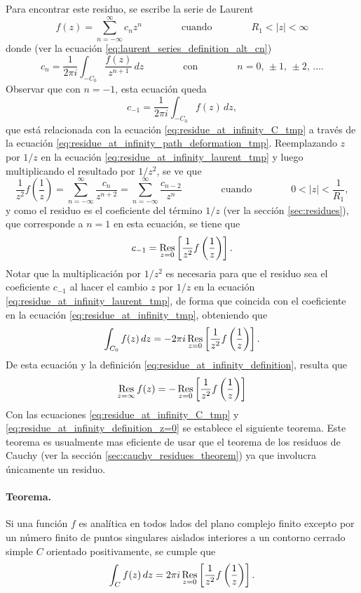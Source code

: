 \documentclass[a4paper]{report}
\def\Res{\qopname\relax m{Res}}
\begin{document}
Para encontrar este residuo, se escribe la serie de Laurent
\begin{equation}\label{eq:residue_at_infinity_laurent_tmp}
 f(z)=\sum_{n=-\infty}^\infty c_nz^n
 \qquad\qquad\textrm{cuando}\qquad\qquad
 R_1<|z|<\infty
\end{equation}
donde (ver la ecuación \ref{eq:laurent_series_definition_alt_cn})
\[
 c_n=\frac{1}{2\pi i}\int_{-C_0}\frac{f(z)}{z^{n+1}}\,dz
 \qquad\qquad\textrm{con}\qquad\qquad
 n=0,\,\pm1,\,\pm2,\,\dots. 
\]
Observar que con \(n=-1\), esta ecuación queda
\begin{equation}\label{eq:residue_at_infinity_tmp}
  c_{-1}=\frac{1}{2\pi i}\int_{-C_0}f(z)\,dz, 
\end{equation}
que está relacionada con la ecuación \ref{eq:residue_at_infinity_C_tmp} a través de la ecuación \ref{eq:residue_at_infinity_path_deformation_tmp}. Reemplazando \(z\) por \(1/z\) en la ecuación \ref{eq:residue_at_infinity_laurent_tmp} y luego multiplicando el resultado por \(1/z^2\), se ve que 
\[
 \frac{1}{z^2}f\left(\frac{1}{z}\right)=\sum_{n=-\infty}^\infty\frac{c_n}{z^{n+2}}
  =\sum_{n=-\infty}^\infty\frac{c_{n-2}}{z^n}
 \qquad\qquad\textrm{cuando}\qquad\qquad
 0<|z|<\frac{1}{R_1},
\]
y como el residuo es el coeficiente del término \(1/z\) (ver la sección \ref{sec:residues}), que corresponde a \(n=1\) en esta ecuación, se tiene que 
\[
 c_{-1}=\Res_{z=0}\left[\frac{1}{z^2}f\left(\frac{1}{z}\right)\right].
\]
Notar que la multiplicación por \(1/z^2\) es necesaria para que el residuo sea el coeficiente \(c_{-1}\) al hacer el cambio \(z\) por \(1/z\) en la ecuación \ref{eq:residue_at_infinity_laurent_tmp}, de forma que coincida con el coeficiente en la ecuación \ref{eq:residue_at_infinity_tmp}, obteniendo que
\[
 \int_{C_0}f(z)\,dz=-2\pi i\Res_{z=0}\left[\frac{1}{z^2}f\left(\frac{1}{z}\right)\right].
\]
De esta ecuación y la definición \ref{eq:residue_at_infinity_definition}, resulta que 
\begin{equation}\label{eq:residue_at_infinity_definition_z=0}
 \Res_{z=\infty}f(z)=-\Res_{z=0}\left[\frac{1}{z^2}f\left(\frac{1}{z}\right)\right] 
\end{equation}
Con las ecuaciones \ref{eq:residue_at_infinity_C_tmp} y \ref{eq:residue_at_infinity_definition_z=0} se establece el siguiente teorema. Este teorema es usualmente mas eficiente de usar que el teorema de los residuos de Cauchy (ver la sección \ref{sec:cauchy_residues_theorem}) ya que involucra únicamente un residuo.

\paragraph{Teorema.} Si una función \(f\) es analítica en todos lados del plano complejo finito excepto por un número finito de puntos singulares aislados interiores a un contorno cerrado simple \(C\) orientado positivamente, se cumple que 
\begin{equation}\label{eq:residue_at_infinity_integral_evaluation}
 \int_Cf(z)\,dz=2\pi i\Res_{z=0}\left[\frac{1}{z^2}f\left(\frac{1}{z}\right)\right]. 
\end{equation}
\end{document}
